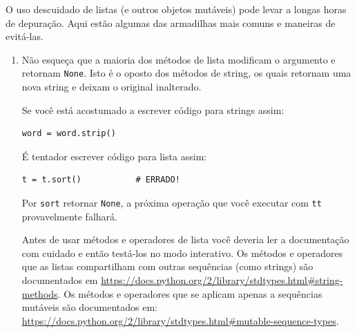 O uso descuidado de listas (e outros objetos mutáveis) 
pode levar a longas horas de depuração. Aqui estão algumas das
armadilhas mais comuns e maneiras de evitá-las.

\begin{enumerate}

\item Não esqueça que a maioria dos métodos de lista modificam o argumento
  e retornam {\tt None}. Isto é o oposto dos métodos de string, os quais retornam
  uma nova string e deixam o original inalterado.

Se você está acostumado a escrever código para strings assim:

\beforeverb
\begin{verbatim}
word = word.strip()
\end{verbatim}
\afterverb

É tentador escrever código para lista assim:

\beforeverb
\begin{verbatim}
t = t.sort()           # ERRADO!
\end{verbatim}
\afterverb


Por {\tt sort} retornar {\tt None}, a
próxima operação que você executar com {\tt tt} provavelmente falhará.

Antes de usar métodos e operadores de lista você deveria ler a documentação com
cuidado e então testá-los no modo interativo. Os métodos e operadores que as listas
compartilham com outras sequências (como strings) são documentados em
\url{https://docs.python.org/2/library/stdtypes.html#string-methods}.
Os métodos e operadores que se aplicam apenas a sequências mutáveis são documentados
em:
\url{https://docs.python.org/2/library/stdtypes.html#mutable-sequence-types}.


\end{enumerate}

